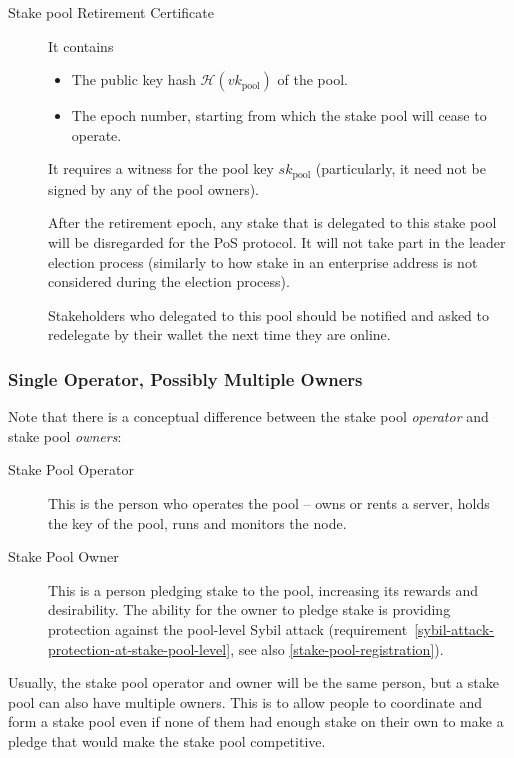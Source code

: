 \documentclass[11pt,a4paper,dvipsnames,twosided]{article}
\begin{document}
\begin{description}
\item[Stake pool Retirement Certificate]
It contains

\begin{itemize}
\item
  The public key hash \(\mathcal{H}(vk_\text{pool})\) of the pool.
\item
  The epoch number, starting from which the stake pool will cease to
  operate.
\end{itemize}

It requires a witness for the pool key \(sk_\text{pool}\) (particularly, it need not
be signed by any of the pool owners).

After the retirement epoch, any stake that is delegated to this stake
pool will be disregarded for the PoS protocol. It will not take part in
the leader election process (similarly to how stake in an enterprise
address is not considered during the election process).

Stakeholders who delegated to this pool should be notified and asked to
redelegate by their wallet the next time they are online.
\end{description}

\subsubsection{Single Operator, Possibly Multiple Owners}
\label{multiple-owners}

Note that there is a conceptual difference between the stake pool
\emph{operator} and stake pool \emph{owners}:
\begin{description}
\item[Stake Pool Operator] This is the person who operates the pool -- owns or
  rents a server, holds the key of the pool, runs and monitors the
  node.
\item[Stake Pool Owner] This is a person pledging stake
  to the pool, increasing its rewards and desirability. The ability
  for the owner to pledge stake is providing protection against the
  pool-level Sybil attack
  (requirement~\ref{sybil-attack-protection-at-stake-pool-level}, see
  also \cref{stake-pool-registration}).
\end{description}

Usually, the stake pool operator and owner will be the same person,
but a stake pool can also have multiple owners. This is to allow
people to coordinate and form a stake pool even if none of them had
enough stake on their own to make a pledge that would make the stake
pool competitive.
\end{document}
